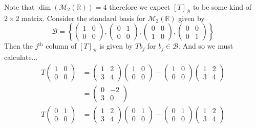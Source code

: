 \documentclass[a4paper, 11pt]{article}
\newcommand{\R}{\mathbb{R}}
\newenvironment{solution}{%
	\begin{list}{}{%
			\setlength{\topsep}{0pt}%
			\setlength{\leftmargin}{1.5cm}%
			\setlength{\rightmargin}{1.5cm}%
			\setlength{\listparindent}{\parindent}%
			\setlength{\itemindent}{\parindent}%
			\setlength{\parsep}{\parskip}%
		}%
		\item[]}{\end{list}}
\begin{document}
\begin{solution}
  \noindent Note that $\dim(\mathcal{M}_2(\R))=4$ therefore we expect $[T]_\mathcal{B}$ to be some kind of $2\times 2$ matrix. Consider the standard basis for $\mathcal{M}_2(\R)$ given by
  \begin{equation*}
    \mathcal{B} = \left\{\begin{pmatrix}1 & 0 \\ 0 & 0 \end{pmatrix}, \begin{pmatrix}0 & 1 \\ 0 & 0 \end{pmatrix}, \begin{pmatrix}0 & 0 \\ 1 & 0 \end{pmatrix}, \begin{pmatrix}0 & 0 \\ 0 & 1 \end{pmatrix}      \right\}
  \end{equation*}
  Then the $j^\text{th}$ column of $[T]_\mathcal{B}$ is given by $Tb_j$ for $b_j\in\mathcal{B}$. And so we must calculate...
  \begin{align*}
    T\begin{pmatrix}1 & 0 \\ 0 & 0 \end{pmatrix} &= \begin{pmatrix} 1 & 2 \\ 3 & 4 \end{pmatrix}\begin{pmatrix}1 & 0 \\ 0 & 0 \end{pmatrix}-\begin{pmatrix}1 & 0 \\ 0 & 0 \end{pmatrix}\begin{pmatrix} 1 & 2 \\ 3 & 4 \end{pmatrix} \\
    &=\begin{pmatrix}0 & -2 \\ 3 & 0 \end{pmatrix}  \\
    T\begin{pmatrix}0 & 1 \\ 0 & 0 \end{pmatrix} &= \begin{pmatrix} 1 & 2 \\ 3 & 4 \end{pmatrix}\begin{pmatrix}0 & 1 \\ 0 & 0 \end{pmatrix}-\begin{pmatrix}0 & 1 \\ 0 & 0 \end{pmatrix}\begin{pmatrix} 1 & 2 \\ 3 & 4 \end{pmatrix} \\

\end{align*}
\end{solution}
\end{document}

